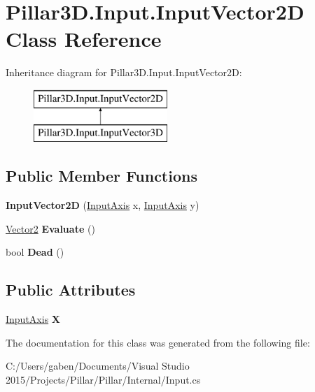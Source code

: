 \hypertarget{class_pillar3_d_1_1_input_1_1_input_vector2_d}{}\section{Pillar3\+D.\+Input.\+Input\+Vector2D Class Reference}
\label{class_pillar3_d_1_1_input_1_1_input_vector2_d}
Inheritance diagram for Pillar3\+D.\+Input.\+Input\+Vector2D\+:\begin{figure}[H]
\begin{center}
\leavevmode
\includegraphics[height=2.000000cm]{class_pillar3_d_1_1_input_1_1_input_vector2_d}
\end{center}
\end{figure}
\subsection*{Public Member Functions}
\begin{DoxyCompactItemize}
\item 
\mbox{\label{class_pillar3_d_1_1_input_1_1_input_vector2_d_a8eb3ccb14fd9446243a05d5d62e7f8ba}} 
{\bfseries Input\+Vector2D} (\hyperlink{class_pillar3_d_1_1_input_1_1_input_axis}{Input\+Axis} x, \hyperlink{class_pillar3_d_1_1_input_1_1_input_axis}{Input\+Axis} y)
\item 
\mbox{\label{class_pillar3_d_1_1_input_1_1_input_vector2_d_a8da29a7be330061dfe6347d6871887d0}} 
\hyperlink{class_pillar3_d_1_1_vector2}{Vector2} {\bfseries Evaluate} ()
\item 
\mbox{\label{class_pillar3_d_1_1_input_1_1_input_vector2_d_a1f9ef3f05ed66987895834c165da2d94}} 
bool {\bfseries Dead} ()
\end{DoxyCompactItemize}
\subsection*{Public Attributes}
\begin{DoxyCompactItemize}
\item 
\mbox{\label{class_pillar3_d_1_1_input_1_1_input_vector2_d_a81509d9a96db00d680d1fb119cb716ab}} 
\hyperlink{class_pillar3_d_1_1_input_1_1_input_axis}{Input\+Axis} {\bfseries X}
\end{DoxyCompactItemize}


The documentation for this class was generated from the following file\+:\begin{DoxyCompactItemize}
\item 
C\+:/\+Users/gaben/\+Documents/\+Visual Studio 2015/\+Projects/\+Pillar/\+Pillar/\+Internal/Input.\+cs\end{DoxyCompactItemize}
